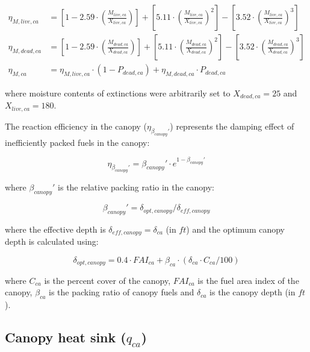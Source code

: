 \documentclass[]{book}
\begin{document}
\begin{eqnarray}
\eta_{M, live, ca} &= \left[1-2.59\cdot \left(\frac{M_{live, ca}}{X_{live, ca}}\right)\right] +\left[ 5.11\cdot \left(\frac{M_{live, ca}}{X_{live, ca}}\right)^2\right]-\left[ 3.52\cdot \left(\frac{M_{live, ca}}{X_{live, ca}}\right)^3\right] \\
\eta_{M, dead, ca} &= \left[1-2.59\cdot \left(\frac{M_{dead, ca}}{X_{dead, ca}}\right)\right] +\left[ 5.11\cdot \left(\frac{M_{dead, ca}}{X_{dead, ca}}\right)^2\right]-\left[ 3.52\cdot \left(\frac{M_{dead, ca}}{X_{dead, ca}}\right)^3\right] \\
\eta_{M, ca} &= \eta_{M, live, ca} \cdot (1 - P_{dead, ca})+ \eta_{M, dead, ca} \cdot P_{dead, ca}
\end{eqnarray}

where moisture contents of extinctions were arbitrarily set to
\(X_{dead, ca} = 25\) and \(X_{live, ca} = 180\).

The reaction efficiency in the canopy (\(\eta_{\beta_{canopy}'}\))
represents the damping effect of inefficiently packed fuels in the
canopy:

\begin{equation}
\eta_{\beta_{canopy}'} =\beta_{canopy}'\cdot e^{1- \beta_{canopy}'}
\end{equation}

where \(\beta_{canopy}'\) is the relative packing ratio in the canopy:

\begin{equation}
\beta_{canopy}' = \delta_{opt, canopy} / \delta_{eff, canopy}
\end{equation}

where the effective depth is \(\delta_{eff, canopy}=\delta_{ca}\) (in
\(ft\)) and the optimum canopy depth is calculated using:

\begin{equation}
\delta_{opt, canopy} = 0.4 \cdot FAI_{ca} + \beta_{ca} \cdot (\delta_{ca} \cdot C_{ca}/100)
\end{equation}

where \(C_{ca}\) is the percent cover of the canopy, \(FAI_{ca}\) is the
fuel area index of the canopy, \(\beta_{ca}\) is the packing ratio of
canopy fuels and \(\delta_{ca}\) is the canopy depth (in \(ft\)).

\subsection{\texorpdfstring{Canopy heat sink
(\(q_{ca}\))}{Canopy heat sink (q\_\{ca\})}}\label{canopy-heat-sink-q_ca}
\end{document}
